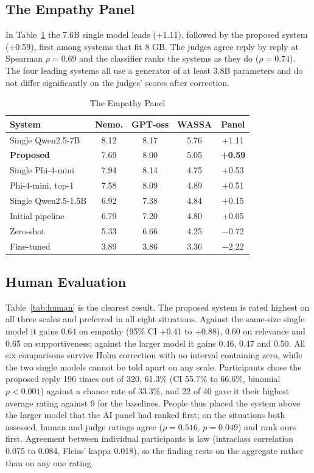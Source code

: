 \subsection{The Empathy Panel}
In Table~\ref{tab:panel} the 7.6B single model leads (+1.11), followed by the proposed system (+0.59), first among systems that fit 8 GB. The judges agree reply by reply at Spearman $\rho=0.69$ and the classifier ranks the systems as they do ($\rho=0.74$). The four leading systems all use a generator of at least 3.8B parameters and do not differ significantly on the judges' scores after correction.

\begin{table}[htbp]
\caption{The Empathy Panel}
\begin{center}
\begin{tabular}{|l|c|c|c|c|}
\hline
\textbf{System} & \textbf{Nemo.} & \textbf{GPT-oss} & \textbf{WASSA} & \textbf{Panel} \\
\hline
Single Qwen2.5-7B & 8.12 & 8.17 & 5.76 & +1.11 \\
\textbf{Proposed} & 7.69 & 8.00 & 5.05 & \textbf{+0.59} \\
Single Phi-4-mini & 7.94 & 8.14 & 4.75 & +0.53 \\
Phi-4-mini, top-1 & 7.58 & 8.09 & 4.89 & +0.51 \\
Single Qwen2.5-1.5B & 6.92 & 7.38 & 4.84 & +0.15 \\
Initial pipeline & 6.79 & 7.20 & 4.80 & +0.05 \\
Zero-shot & 5.33 & 6.66 & 4.25 & $-$0.72 \\
Fine-tuned & 3.89 & 3.86 & 3.36 & $-$2.22 \\
\hline
\end{tabular}
\label{tab:panel}
\end{center}
\end{table}

\subsection{Human Evaluation}
Table~\ref{tab:human} is the clearest result. The proposed system is rated highest on all three scales and preferred in all eight situations. Against the same-size single model it gains 0.64 on empathy (95\% CI +0.41 to +0.88), 0.60 on relevance and 0.65 on supportiveness; against the larger model it gains 0.46, 0.47 and 0.50. All six comparisons survive Holm correction with no interval containing zero, while the two single models cannot be told apart on any scale. Participants chose the proposed reply 196 times out of 320, 61.3\% (CI 55.7\% to 66.6\%, binomial $p<0.001$) against a chance rate of 33.3\%, and 22 of 40 gave it their highest average rating against 9 for the baselines. People thus placed the system above the larger model that the AI panel had ranked first; on the situations both assessed, human and judge ratings agree ($\rho=0.516$, $p=0.049$) and rank ours first. Agreement between individual participants is low (intraclass correlation 0.075 to 0.084, Fleiss' kappa 0.018), so the finding rests on the aggregate rather than on any one rating.

